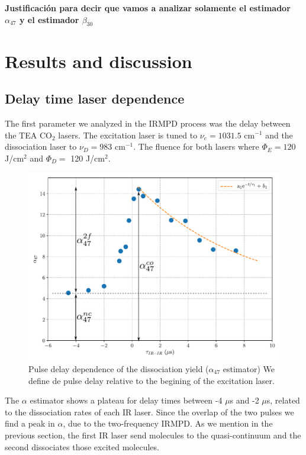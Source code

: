 \documentclass[global,twocolumn]{svjour}
\begin{document}
\textbf{Justificaci\'on para decir que vamos a analizar solamente el estimador $\alpha_{47}$ y el estimador $\beta_{30}$}

\section{Results and discussion}
\subsection{Delay time laser dependence}
The first parameter we analyzed in the IRMPD process was the delay between the TEA CO$_{2}$ lasers. The excitation laser is tuned to $\nu_{e}= 1031.5$ cm$^{−1}$ and the dissociation laser to $\nu_{D}=983$ cm$^{-1}$. The fluence for both lasers where $\Phi_{E}=120 $J/cm$^{2}$ and $\Phi_{D}=$ 120 J/cm$^{2}$.

\begin{figure}[h]
	\includegraphics[width=1\linewidth]{figures/alfa_47_decaimiento.pdf}
	\caption{Pulse delay dependence of the dissociation yield ($\alpha_{47}$ estimator) We define de pulse delay relative to the begining of the excitation laser.}
	\label{fig:alpha_47_estimator}
\end{figure}

The $\alpha$ estimator shows a plateau for delay times between -4 $\mu$s and -2 $\mu$s, related to the dissociation rates of each IR laser. Since the overlap of the two pulses we find a peak in $\alpha$, due to the two-frequency IRMPD. As we mention in the previous section, the first IR laser send molecules to the quasi-continuum and the second dissociates those excited molecules.
\end{document}
